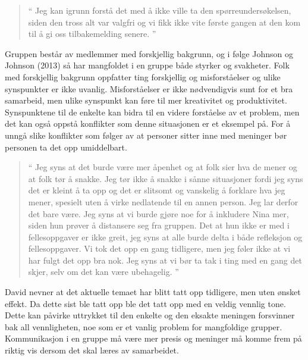 \begin{quote}``
Jeg kan igrunn forstå det med å ikke ville ta den spørreundersøkelsen, siden den 
tross alt var valgfri og vi fikk ikke vite første gangen at den kom til å gi oss tilbakemelding senere.
''\end{quote} 

Gruppen består av medlemmer med forskjellig bakgrunn, og i følge Johnson og Johnson (2013) så har mangfoldet i en gruppe 
både styrker og svakheter. Folk med forskjellig bakgrunn oppfatter ting forskjellig og misforståelser og ulike synspunkter er 
ikke uvanlig. Misforståelser er ikke nødvendigvis sunt for et bra samarbeid, men ulike synspunkt kan føre til mer kreativitet 
og produktivitet. \cite{Artikkel2} Synspunktene til de enkelte kan bidra til en videre forståelse av et problem, men det kan også oppstå 
konflikter som denne situasjonen er et eksempel på.
For å unngå slike konflikter som følger av at personer sitter inne med meninger bør personen ta det opp umiddelbart.

\begin{quote}``
Jeg syns at det burde være mer åpenhet og at folk sier hva de 
mener og at folk tør å snakke. Jeg tør ikke å snakke i sånne situasjoner fordi jeg syns det er kleint å ta opp og det 
er slitsomt og vanskelig å forklare hva jeg mener, spesielt uten å virke nedlatende til en annen person. Jeg lar derfor
det bare være. Jeg syns at vi burde gjøre noe for å inkludere Nina mer, siden hun prøver å distansere seg fra gruppen. 
Det at hun ikke er med i fellesoppgaver er ikke greit, jeg syns at alle burde delta i både refleksjon og 
fellesoppgaver. Vi tok det opp en gang tidligere, men jeg føler ikke at vi har fulgt det opp bra nok. Jeg syns at vi bør 
ta tak i ting med en gang det skjer, selv om det kan være ubehagelig.
''\end{quote} 

David nevner at det aktuelle temaet har blitt tatt opp tidligere, men uten ønsket effekt. Da dette sist ble tatt opp ble
det tatt opp med en veldig vennlig tone. Dette kan påvirke uttrykket til den enkelte og den eksakte meningen 
forsvinner bak all vennligheten, noe som er et vanlig problem for mangfoldige grupper. \cite{Artikkel2} 
Kommunikasjon i en gruppe må være mer presis og meninger må komme frem på
riktig vis dersom det skal læres av samarbeidet.  

